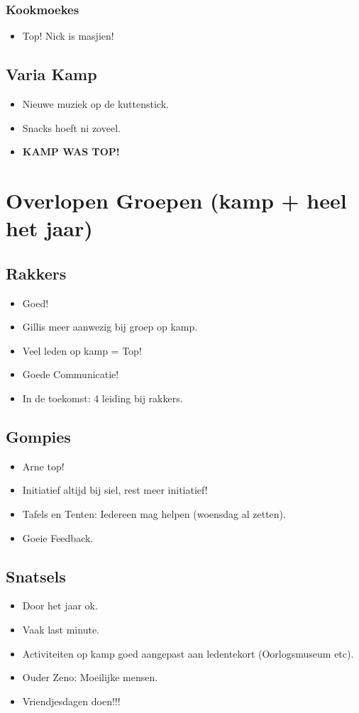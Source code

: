 \documentclass[pdftex,12pt,a4paper,english,titlepage]{article}
\begin{document}
\subsubsection{Kookmoekes}
\begin{itemize}
	\item Top! Nick is masjien!
\end{itemize}

\subsection{Varia Kamp}
\begin{itemize}
	\item Nieuwe muziek op de kuttenstick.
	\item Snacks hoeft ni zoveel.
	\item \textbf{KAMP WAS TOP!}
\end{itemize}

\section{Overlopen Groepen (kamp + heel het jaar)}

\subsection{Rakkers}
\begin{itemize}
	\item Goed!
	\item Gillis meer aanwezig bij groep op kamp.
	\item Veel leden op kamp = Top!
	\item Goede Communicatie!
	\item In de toekomst: 4 leiding bij rakkers.
\end{itemize}

\subsection{Gompies}
\begin{itemize}
	\item Arne top!
	\item Initiatief altijd bij siel, rest meer initiatief!
	\item Tafels en Tenten: Iedereen mag helpen (woensdag al zetten).
	\item Goeie Feedback.
\end{itemize}

\subsection{Snatsels}
\begin{itemize}
	\item Door het jaar ok.
	\item Vaak last minute.
	\item Activiteiten op kamp goed aangepast aan ledentekort (Oorlogsmuseum etc).
	\item Ouder Zeno: Moeilijke mensen.
	\item Vriendjesdagen doen!!!
\end{itemize}
\end{document}
